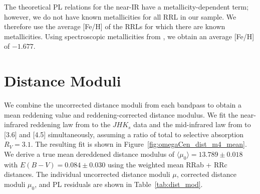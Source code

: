 \documentclass[a4paper,fleqn,usenatbib]{mnras}
\begin{document}
The theoretical PL relations for the near-IR have a metallicity-dependent term; however, we do not have known metallicities for all RRL in our sample. We therefore use the average [Fe/H] of the RRLs for which there are known metallicities. Using spectroscopic metallicities from \citet{2006ApJ...640L..43S}, we obtain an average [Fe/H] of $-1.677$.


\section{Distance Moduli}
\label{sec:distance_moduli}

We combine the uncorrected distance moduli from each bandpass to obtain a mean reddening value and reddening-corrected distance modulus. We fit the near-infrared reddening law from \citet{1989ApJ...345..245C} to the $JHK_s$ data and the mid-infrared law from \citet{2005ApJ...619..931I} to [3.6] and [4.5] simultaneously, assuming a ratio of total to selective absorption $R_V = 3.1$. The resulting fit is shown in Figure~\ref{fig:omegaCen_dist_m4_mean}. We derive a true mean dereddened distance modulus of $\langle \mu_0 \rangle = 13.789 \pm 0.018$ with $E(B-V) = 0.084 \pm 0.030$ using the weighted mean RRab + RRc distances. The individual uncorrected distance moduli $\mu$, corrected distance moduli $\mu_0$, and PL residuals are shown in Table~\ref{tab:dist_mod}.
\end{document}
